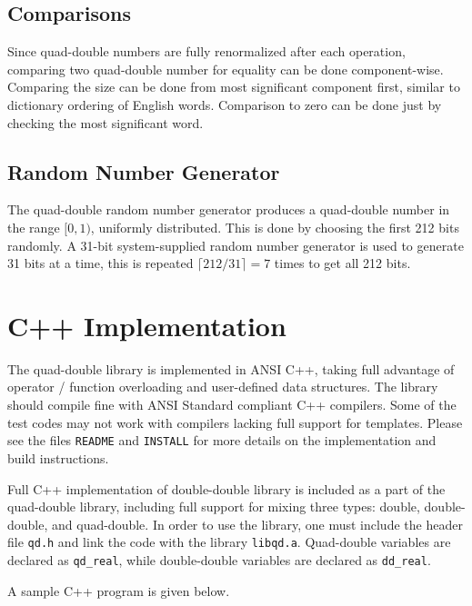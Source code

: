 \documentclass[11pt]{article}
\theoremstyle{definition}
\begin{document}
\subsection{Comparisons}
Since quad-double numbers are fully renormalized after each 
operation, comparing two quad-double number for equality can
be done component-wise.  Comparing the size can be done from
most significant component first, similar to dictionary ordering
of English words.  Comparison to zero can be done just by checking
the most significant word.

\subsection{Random Number Generator}
The quad-double random number generator produces a quad-double
number in the range $[0, 1)$, uniformly distributed.  This is 
done by choosing the first 212 bits randomly.  A 31-bit system-supplied
random number generator is used to generate 31 bits at a time, 
this is repeated $\lceil 212 / 31 \rceil = 7$ times to get
all 212 bits.

\section{C++ Implementation} \label{sec:implement}
  The quad-double library is implemented in ANSI C++, taking full
advantage of operator / function overloading and user-defined data 
structures.  The library should compile fine with ANSI Standard compliant
C++ compilers.  Some of the test codes may not work with compilers
lacking full support for templates.  Please see the files {\tt README}
and {\tt INSTALL} for more details on the implementation and build 
instructions.

  Full C++ implementation of double-double library is included as
a part of the quad-double library, including full support for mixing
three types: double, double-double, and quad-double.  In order to use
the library, one must include the header file {\tt qd.h} 
and link the code with the library {\tt libqd.a}.  
Quad-double variables are declared as {\tt qd\_real}, while double-double
variables are declared as {\tt dd\_real}.

A sample C++ program is given below.

\bigskip
\end{document}
